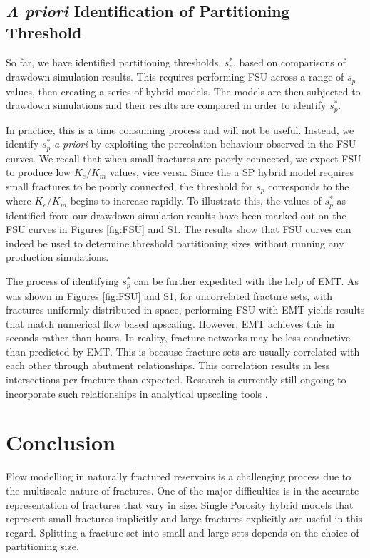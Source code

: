\documentclass[draft]{agujournal2018}
\begin{document}
\subsection{\textit{A priori} Identification of Partitioning Threshold}
So far, we have identified partitioning thresholds, $s_p^*$, based on comparisons of drawdown simulation results. This requires performing FSU across a range of $s_p$ values, then creating a series of hybrid models. The models are then subjected to drawdown simulations and their results are compared in order to identify $s_p^*$.

In practice, this is a time consuming process and will not be useful. Instead, we identify $s_p^*$ \textit{a priori} by exploiting the percolation behaviour observed in the FSU curves. We recall that when small fractures are poorly connected, we expect FSU to produce low $K_e/K_m$ values, vice versa. Since the a SP hybrid model requires small fractures to be poorly connected, the threshold for $s_p$ corresponds to the where $K_e/K_m$ begins to increase rapidly. To illustrate this, the values of $s_p^*$ as identified from our drawdown simulation results have been marked out on the FSU curves in Figures \ref{fig:FSU} and S1. The results show that FSU curves can indeed be used to determine threshold partitioning sizes without running any production simulations.

The process of identifying $s_p^*$ can be further expedited with the help of EMT. As was shown in Figures \ref{fig:FSU} and S1, for uncorrelated fracture sets, with fractures uniformly distributed in space, performing FSU with EMT yields results that match numerical flow based upscaling. However, EMT achieves this in seconds rather than hours. In reality, fracture networks may be less conductive than predicted by EMT. This is because fracture sets are usually correlated with each other through abutment relationships. This correlation results in less intersections per fracture than expected. Research is currently still ongoing to incorporate such relationships in analytical upscaling tools \citep{Hardebol2015, Makel2007, Saevik2017}. 

\section{Conclusion}
Flow modelling in naturally fractured reservoirs is a challenging process due to the multiscale nature of fractures. One of the major difficulties is in the accurate representation of fractures that vary in size. Single Porosity hybrid models that represent small fractures implicitly and large fractures explicitly are useful in this regard. Splitting a fracture set into small and large sets depends on the choice of partitioning size.
\end{document}
